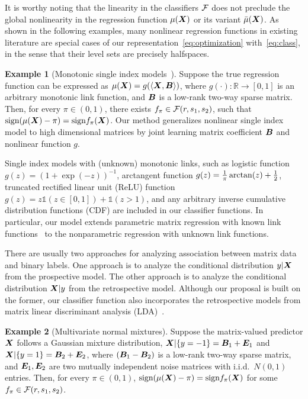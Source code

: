 \documentclass[11pt]{article}
\theoremstyle{plain}
\theoremstyle{definition}
\newtheorem{example}{Example}
\def\sign{\textup{sign}}
\begin{document}
It is worthy noting that the linearity in the classifiers $\mathcal{F}$ does not preclude the global nonlinearity in the regression function $\mu(\bm X)$ or its variant $\bar \mu(\bm X)$. As shown in the following examples, many nonlinear regression functions in existing literature are special cases of our representation~\eqref{eq:optimization} with~\eqref{eq:class}, in the sense that their level sets are precisely halfspaces. 

\begin{example}[Monotonic single index models~\citep{alquier2013sparse,ganti2017learning}]\label{example:1}
Suppose the true regression function can be expressed as $\mu(\bm X)= g(\langle \bm X,\bm B\rangle)$, where $g(\cdot)\colon \mathbb{R}\to [0,1]$ is an arbitrary monotonic link function, and $\bm B$ is a low-rank two-way sparse matrix. Then, for every $\pi\in(0,1)$, there exists $f_\pi\in \mathcal{F}(r,s_1,s_2)$, such that $\sign(\mu(\mX)-\pi)= \sign f_\pi(\mX)$. Our method generalizes nonlinear single index model to high dimensional matrices by joint learning matrix coefficient $\bm B$ and nonlinear function $g$. 
\end{example}

Single index models with (unknown) monotonic links, such as logistic function $g(z)=(1+\exp(-z))^{-1}$, arctangent function $g(z)={1\over \pi}\arctan(z)+{1\over 2}$, truncated rectified linear unit (ReLU) function $g(z)=z\mathds{1}(z\in[0,1])+\mathds{1}(z>1)$, and any arbitrary inverse cumulative distribution functions (CDF) are included in our classifier functions. In particular, our model extends parametric matrix regression with known link functions~\citep{zhou2014regularized,guha2020bayesian,relion2019network} to the nonparametric regression with unknown link functions. 

There are usually two approaches for analyzing association between matrix data and binary labels. One approach is to analyze the conditional distribution $y|\bm X$ from the prospective model. The other approach is to analyze the conditional distribution $\bm X|y$ from the retrospective model. Although our proposal is built on the former, our classifier function also incorporates the retrospective models from matrix linear discriminant analysis (LDA)~\citep{hu2020matrix}. 
\begin{example}[Multivariate normal mixtures]\label{example2}Suppose the matrix-valued predictor $\bm X$ follows a Gaussian mixture distribution, $\bm X|\{y=-1\}=\bm B_1+\bm{E}_1$ and $ \bm X|\{y=1\}=\bm B_2+\bm{E}_2$, where $(\bm B_1-\bm B_2)$ is a low-rank two-way sparse matrix, and $\bm{E}_1, \bm{E}_2$ are two mutually independent noise matrices with i.i.d.\ $N(0,1)$ entries. Then, for every $\pi\in(0,1)$, $\sign(\mu(\mX)-\pi)= \sign f_\pi (\mX)$ for some $f_\pi \in \mathcal{F}(r,s_1,s_2)$. 
\end{example}
\end{document}
